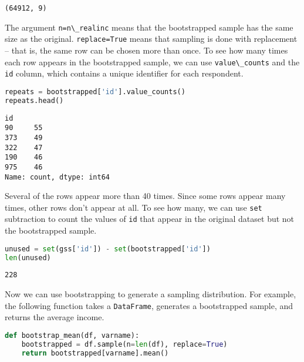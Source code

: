 \begin{lstlisting}[style=output]
(64912, 9)
\end{lstlisting}

The argument \passthrough{\lstinline!n=n\_realinc!} means that the
bootstrapped sample has the same size as the original.
\passthrough{\lstinline!replace=True!} means that sampling is done with
replacement -- that is, the same row can be chosen more than once. To
see how many times each row appears in the bootstrapped sample, we can
use \passthrough{\lstinline!value\_counts!} and the
\passthrough{\lstinline!id!} column, which contains a unique identifier
for each respondent.

\begin{lstlisting}[language=Python,style=source]
repeats = bootstrapped['id'].value_counts()
repeats.head()
\end{lstlisting}

\begin{lstlisting}[style=output]
id
90     55
373    49
322    47
190    46
975    46
Name: count, dtype: int64
\end{lstlisting}

Several of the rows appear more than 40 times. Since some rows appear
many times, other rows don't appear at all. To see how many, we can use
\passthrough{\lstinline!set!} subtraction to count the values of
\passthrough{\lstinline!id!} that appear in the original dataset but not
the bootstrapped sample.

\begin{lstlisting}[language=Python,style=source]
unused = set(gss['id']) - set(bootstrapped['id'])
len(unused)
\end{lstlisting}

\begin{lstlisting}[style=output]
228
\end{lstlisting}

Now we can use bootstrapping to generate a sampling distribution. For
example, the following function takes a
\passthrough{\lstinline!DataFrame!}, generates a bootstrapped sample,
and returns the average income.

\begin{lstlisting}[language=Python,style=source]
def bootstrap_mean(df, varname):
    bootstrapped = df.sample(n=len(df), replace=True)
    return bootstrapped[varname].mean()
\end{lstlisting}

